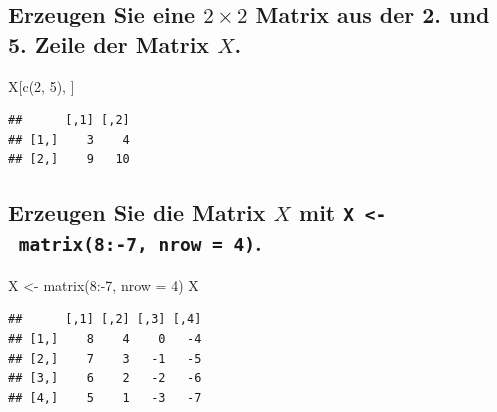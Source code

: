 \documentclass[12pt,a4paper]{article}
\newenvironment{Shaded}{\begin{snugshade}}{\end{snugshade}}
\newcommand{\AttributeTok}[1]{\textcolor[rgb]{0.77,0.63,0.00}{#1}}
\newcommand{\DecValTok}[1]{\textcolor[rgb]{0.00,0.00,0.81}{#1}}
\newcommand{\FunctionTok}[1]{\textcolor[rgb]{0.00,0.00,0.00}{#1}}
\newcommand{\NormalTok}[1]{#1}
\newcommand{\OtherTok}[1]{\textcolor[rgb]{0.56,0.35,0.01}{#1}}
\newcommand{\SpecialCharTok}[1]{\textcolor[rgb]{0.00,0.00,0.00}{#1}}
\begin{document}
\vspace{0.5cm}

\hypertarget{erzeugen-sie-eine-2-times-2-matrix-aus-der-2.-und-5.-zeile-der-matrix-x.}{%
\subsection{\texorpdfstring{Erzeugen Sie eine \(2 \times 2\) Matrix aus
der 2. und 5. Zeile der Matrix
\(X\).}{Erzeugen Sie eine 2 \textbackslash times 2 Matrix aus der 2. und 5. Zeile der Matrix X.}}\label{erzeugen-sie-eine-2-times-2-matrix-aus-der-2.-und-5.-zeile-der-matrix-x.}}

\begin{Shaded}
\begin{Highlighting}[]
\NormalTok{    X[}\FunctionTok{c}\NormalTok{(}\DecValTok{2}\NormalTok{, }\DecValTok{5}\NormalTok{), ]}
\end{Highlighting}
\end{Shaded}

\begin{verbatim}
##      [,1] [,2]
## [1,]    3    4
## [2,]    9   10
\end{verbatim}

\vspace{0.5cm}

\hypertarget{erzeugen-sie-die-matrix-x-mit-x---matrix8-7-nrow-4.}{%
\subsection{\texorpdfstring{Erzeugen Sie die Matrix \(X\) mit
\texttt{X\ \textless{}-\ matrix(8:-7,\ nrow\ =\ 4)}.}{Erzeugen Sie die Matrix X mit X \textless- matrix(8:-7, nrow = 4).}}\label{erzeugen-sie-die-matrix-x-mit-x---matrix8-7-nrow-4.}}

\begin{Shaded}
\begin{Highlighting}[]
\NormalTok{    X }\OtherTok{\textless{}{-}} \FunctionTok{matrix}\NormalTok{(}\DecValTok{8}\SpecialCharTok{:{-}}\DecValTok{7}\NormalTok{, }\AttributeTok{nrow =} \DecValTok{4}\NormalTok{)}
\NormalTok{    X}
\end{Highlighting}
\end{Shaded}

\begin{verbatim}
##      [,1] [,2] [,3] [,4]
## [1,]    8    4    0   -4
## [2,]    7    3   -1   -5
## [3,]    6    2   -2   -6
## [4,]    5    1   -3   -7
\end{verbatim}
\end{document}
